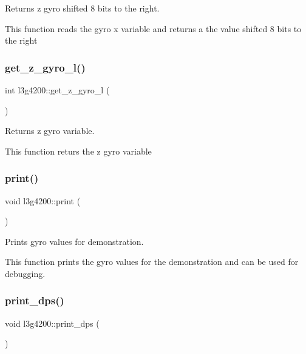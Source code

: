 Returns z gyro shifted 8 bits to the right. 

This function reads the gyro x variable and returns a the value shifted 8 bits to the right \mbox{\label{classl3g4200_a6050692b28be5dd532ed91e346545ca3}} 
\subsubsection{\texorpdfstring{get\+\_\+z\+\_\+gyro\+\_\+l()}{get\_z\_gyro\_l()}}
{\footnotesize\ttfamily int l3g4200\+::get\+\_\+z\+\_\+gyro\+\_\+l (\begin{DoxyParamCaption}{ }\end{DoxyParamCaption})\hspace{0.3cm}{\ttfamily [inline]}}



Returns z gyro variable. 

This function returs the z gyro variable \mbox{\label{classl3g4200_a9caa7f50a94100706898f049c2bb8d95}} 
\subsubsection{\texorpdfstring{print()}{print()}}
{\footnotesize\ttfamily void l3g4200\+::print (\begin{DoxyParamCaption}{ }\end{DoxyParamCaption})\hspace{0.3cm}{\ttfamily [inline]}}



Prints gyro values for demonstration. 

This function prints the gyro values for the demonstration and can be used for debugging. \mbox{\label{classl3g4200_a15152a95cc9df7c8e6660c6b62eb48d6}} 
\subsubsection{\texorpdfstring{print\+\_\+dps()}{print\_dps()}}
{\footnotesize\ttfamily void l3g4200\+::print\+\_\+dps (\begin{DoxyParamCaption}{ }\end{DoxyParamCaption})\hspace{0.3cm}{\ttfamily [inline]}}



